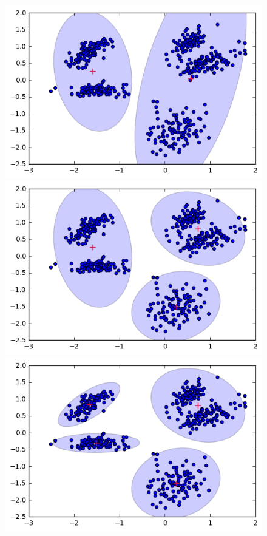 \documentclass[a4paper,11pt]{article}
\begin{document}
\begin{figure}[htbp]
  \includegraphics[scale=0.3]{gmmnkmk2.png}
  \includegraphics[scale=0.3]{gmmnkmk3.png}
  \includegraphics[scale=0.3]{gmmnkmk4.png}

\end{figure}
\end{document}
